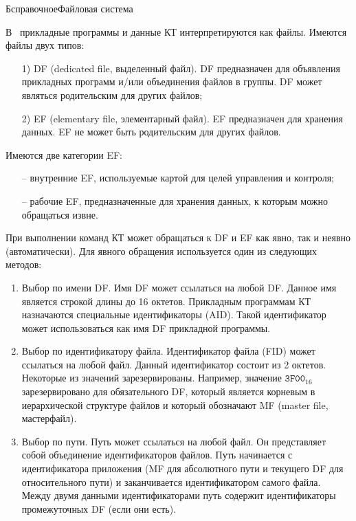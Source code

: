 \begin{appendix}{Б}{справочное}{Файловая система}
\label{FILES}


В~\cite{APDU} прикладные программы и данные КТ интерпретируются как 
файлы. Имеются файлы двух типов: 

\begin{enumerate}
\item[1)]
DF (dedicated file, выделенный файл). DF предназначен для 
объявления прикладных программ и/или объединения файлов в группы. DF может 
являться родительским для других файлов;

\item[2)]
EF (elementary file, элементарный файл). EF предназначен для 
хранения данных. EF не может быть родительским для других файлов.  
\end{enumerate}

Имеются две категории EF:
\begin{itemize}
\item[--] 
внутренние EF, используемые картой для целей управления и контроля;  
\item[--]
рабочие EF, предназначенные для хранения данных, к которым можно обращаться извне.
\end{itemize}                                                            
                  
При выполнении команд КТ может обращаться к DF и EF как явно, так и неявно 
(автоматически). Для явного обращения используется один из следующих 
методов: 
\begin{enumerate}
\item
Выбор по имени DF. Имя DF может ссылаться на любой DF. Данное имя 
является строкой длины до 16 октетов. Прикладным программам КТ назначаются 
специальные идентификаторы (AID). Такой идентификатор может использоваться 
как имя DF прикладной программы. 

\item
Выбор по идентификатору файла. Идентификатор файла (FID) может 
ссылаться на любой файл. Данный идентификатор состоит из 2 октетов. 
Некоторые из значений зарезервированы. Например, 
значение $\texttt{3F00}_{16}$ зарезервировано для обязательного DF, 
который является корневым в иерархической структуре файлов и 
который обозначают MF (master file, мастерфайл). 

\item
Выбор по пути. Путь может ссылаться на любой файл. Он 
представляет собой объединение идентификаторов файлов. Путь начинается с 
идентификатора приложения (MF для абсолютного пути и текущего DF для 
относительного пути) и заканчивается идентификатором самого файла. Между 
двумя данными идентификаторами путь содержит идентификаторы промежуточных 
DF (если они есть). 


\end{enumerate}
\end{appendix}
